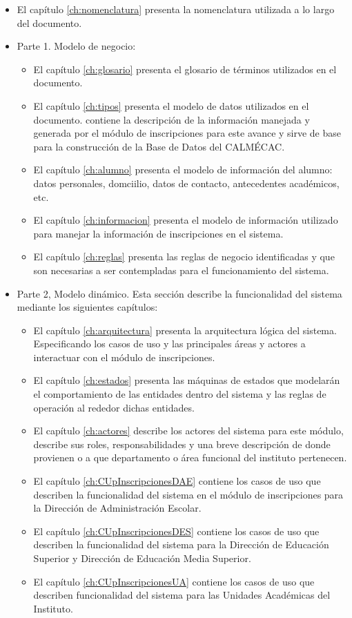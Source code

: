 	\begin{itemize}
		\item El capítulo \ref{ch:nomenclatura} presenta la nomenclatura utilizada a lo largo del documento.
		\item Parte 1. Modelo de negocio:
			\begin{itemize}
				\item El capítulo \ref{ch:glosario} presenta el glosario de términos utilizados en el documento.
				\item El capítulo \ref{ch:tipos} presenta el modelo de datos utilizados en el documento. contiene la descripción de la información manejada y generada por el módulo de inscripciones para este avance y sirve de base para la construcción de la Base de Datos del CALMÉCAC.
				\item El capítulo \ref{ch:alumno} presenta el modelo de información del alumno: datos personales, domciilio, datos de contacto, antecedentes académicos, etc.
				\item El capítulo \ref{ch:informacion} presenta el modelo de información utilizado para manejar la información de inscripciones  en el sistema.
				\item El capítulo \ref{ch:reglas} presenta las reglas de negocio identificadas y que son necesarias a ser contempladas para el funcionamiento del sistema.
			\end{itemize}

		\item Parte 2, Modelo dinámico. Esta sección describe la funcionalidad del sistema mediante los siguientes capítulos:
		\begin{itemize}
			\item El capítulo \ref{ch:arquitectura} presenta la arquitectura lógica del sistema. Especificando los casos de uso y las principales áreas y actores a interactuar con el módulo de inscripciones.
			\item El capítulo \ref{ch:estados} presenta las máquinas de estados que modelarán el comportamiento de las entidades dentro del sistema y las reglas de operación al rededor dichas entidades.
			\item El capítulo \ref{ch:actores} describe los actores del sistema para este módulo, describe sus roles, responsabilidades y una breve descripción de donde provienen o a que departamento o área funcional del instituto pertenecen.
			\item El capítulo \ref{ch:CUpInscripcionesDAE} contiene los casos de uso que describen la funcionalidad del sistema en el módulo de inscripciones para la Dirección de Administración Escolar.
			\item El capítulo \ref{ch:CUpInscripcionesDES} contiene los casos de uso que describen la funcionalidad del sistema para la Dirección de Educación Superior y Dirección de Educación Media Superior.
			\item El capítulo \ref{ch:CUpInscripcionesUA} contiene los casos de uso que describen funcionalidad del sistema para las Unidades Académicas del Instituto.
		\end{itemize}


\end{itemize}

